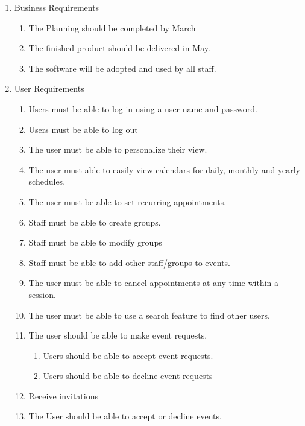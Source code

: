 \documentclass[a4paper]{article}
\begin{document}
\begin{enumerate}
  \item Business Requirements
  \begin{enumerate}[label=B\arabic*.]
    \item The Planning should be completed by March 
    \item The finished product should be delivered in May.
    \item The software will be adopted and used by all staff.
  \end{enumerate}

  \item User Requirements
  \begin{enumerate}[label=U\arabic*.] 
    \item Users must be able to log in using a user name and password.
    \item Users must be able to log out
    \item The user must be able to personalize their view.
    \item The user must able to easily view calendars for daily, monthly and yearly schedules.
    \item The user must be able to set recurring appointments.
    \item Staff must be able to create groups.
    \item Staff must be able to modify groups
    \item Staff must be able to add other staff/groups to events.
    \item The user must be able to cancel appointments at any time within a session.
    \item The user must be able to use a search feature to find other users.
    \item The user should be able to make event requests. 
    \begin{enumerate}[label*=\arabic*.]
      \item Users should be able to accept event requests.
      \item Users should be able to decline event requests
    \end{enumerate}
    \item Receive invitations  %
    \item The User should be able to accept or decline events. %
  \end{enumerate}


\end{enumerate}
\end{document}
